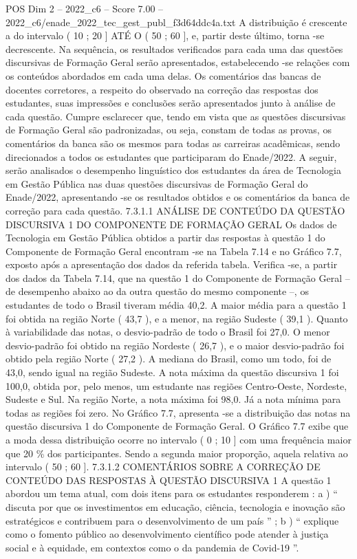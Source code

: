 \begin{textsample}{POS Dim 2 – 2022\_c6 – Score 7.00 – 2022\_c6/enade\_2022\_tec\_gest\_publ\_f3d64ddc4a.txt}
A distribuição é crescente a do intervalo ( 10 ; 20 ] ATÉ O ( 50 ; 60 ], e, partir deste último, torna -se decrescente.
Na sequência, os resultados verificados para cada uma das questões discursivas de Formação Geral serão apresentados, estabelecendo -se relações com os conteúdos abordados em cada uma delas.
Os comentários das bancas de docentes corretores, a respeito do observado na correção das respostas dos estudantes, suas impressões e conclusões serão apresentados junto à análise de cada questão.
Cumpre esclarecer que, tendo em vista que as questões discursivas de Formação Geral são padronizadas, ou seja, constam de todas as provas, os comentários da banca são os mesmos para todas as carreiras acadêmicas, sendo direcionados a todos os estudantes que participaram do Enade/2022.
A seguir, serão analisados o desempenho linguístico dos estudantes da área de Tecnologia em Gestão Pública nas duas questões discursivas de Formação Geral do Enade/2022, apresentando -se os resultados obtidos e os comentários da banca de correção para cada questão. 7.3.1.1 ANÁLISE DE CONTEÚDO DA QUESTÃO DISCURSIVA 1 DO COMPONENTE DE FORMAÇÃO GERAL Os dados de Tecnologia em Gestão Pública obtidos a partir das respostas à questão 1 do Componente de Formação Geral encontram -se na Tabela 7.14 e no Gráfico 7.7, exposto após a apresentação dos dados da referida tabela.
Verifica -se, a partir dos dados da Tabela 7.14, que na questão 1 do Componente de Formação Geral – de desempenho abaixo ao da outra questão do mesmo componente –, os estudantes de todo o Brasil tiveram média 40,2.
A maior média para a questão 1 foi obtida na região Norte ( 43,7 ), e a menor, na região Sudeste ( 39,1 ).
Quanto à variabilidade das notas, o desvio-padrão de todo o Brasil foi 27,0.
O menor desvio-padrão foi obtido na região Nordeste ( 26,7 ), e o maior desvio-padrão foi obtido pela região Norte ( 27,2 ).
A mediana do Brasil, como um todo, foi de 43,0, sendo igual na região Sudeste.
A nota máxima da questão discursiva 1 foi 100,0, obtida por, pelo menos, um estudante nas regiões Centro-Oeste, Nordeste, Sudeste e Sul.
Na região Norte, a nota máxima foi 98,0.
Já a nota mínima para todas as regiões foi zero.
No Gráfico 7.7, apresenta -se a distribuição das notas na questão discursiva 1 do Componente de Formação Geral.
O Gráfico 7.7 exibe que a moda dessa distribuição ocorre no intervalo ( 0 ; 10 ] com uma frequência maior que 20 \% dos participantes.
Sendo a segunda maior proporção, aquela relativa ao intervalo ( 50 ; 60 ]. 7.3.1.2 COMENTÁRIOS SOBRE A CORREÇÃO DE CONTEÚDO DAS RESPOSTAS À QUESTÃO DISCURSIVA 1 A questão 1 abordou um tema atual, com dois itens para os estudantes responderem : a ) “ discuta por que os investimentos em educação, ciência, tecnologia e inovação são estratégicos e contribuem para o desenvolvimento de um país ” ; b ) “ explique como o fomento público ao desenvolvimento científico pode atender à justiça social e à equidade, em contextos como o da pandemia de Covid-19 ”.

\end{textsample}
